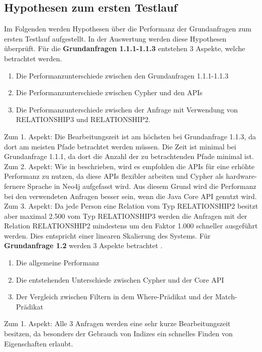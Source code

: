\subsection{Hypothesen zum ersten Testlauf}
Im Folgenden werden Hypothesen über die Performanz der Grundanfragen zum ersten Testlauf aufgestellt. In der Auswertung werden diese Hypothesen überprüft. \newline \newline
Für die \textbf{Grundanfragen 1.1.1-1.1.3} entstehen 3 Aspekte, welche betrachtet werden.
\begin{enumerate}
\item Die Performanzunterschiede zwischen den Grundanfragen 1.1.1-1.1.3
\item Die Performanzunterschiede zwischen Cypher und den APIs
\item Die Performanzunterschiede zwischen der Anfrage mit Verwendung von RELATIONSHIP3 und RELATIONSHIP2.
\end{enumerate}
Zum 1. Aspekt: Die Bearbeitungszeit ist am höchsten bei Grundanfrage 1.1.3, da dort am meisten Pfade betrachtet werden müssen. Die Zeit ist minimal bei Grundanfrage 1.1.1, da dort die Anzahl der zu betrachtenden Pfade minimal ist. \newline
 Zum 2. Aspekt: Wie in \parencite{raj2015neo4j} beschrieben, wird es empfohlen die APIs für eine erhöhte Performanz zu nutzen, da diese APIs flexibler arbeiten und Cypher als hardware-fernere Sprache in Neo4j aufgefasst wird. Aus diesem Grund wird die Performanz bei den verwendeten Anfragen besser sein, wenn die Java Core API genutzt wird. \newline
Zum 3. Aspekt: Da jede Person eine Relation vom Typ RELATIONSHIP2 besitzt aber maximal 2.500 vom Typ RELATIONSHIP3 werden die Anfragen mit der Relation RELATIONSHIP2 mindestens um den Faktor 1.000 schneller ausgeführt werden. Dies entspricht einer linearen Skalierung des Systems. \newline \newline
Für \textbf{Grundanfrage 1.2} werden 3 Aspekte betrachtet .
\begin{enumerate}
	\item Die allgemeine Performanz 
	\item Die entstehenden Unterschiede zwischen Cypher und der Core API
	\item Der Vergleich zwischen Filtern in dem Where-Prädikat und der Match-Prädikat
\end{enumerate}
Zum 1. Aspekt: Alle 3 Anfragen werden eine sehr kurze Bearbeitungszeit besitzen, da besonders der Gebrauch von Indizes ein schnelles Finden von Eigenschaften erlaubt. \newline
